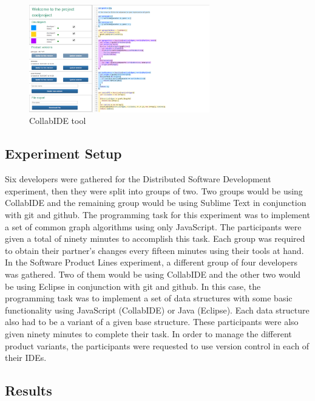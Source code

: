 \begin{figure}[htbp]
  \centering
  \includegraphics[width=0.7\textwidth]{img/fig1-collabIDEGeneral}
  \caption{CollabIDE tool}
  \label{fig:collabide}
\end{figure}

\subsection{Experiment Setup}

Six developers were gathered for the Distributed Software Development experiment, then they were split into groups of two. Two groups would be using CollabIDE and the remaining group would be using Sublime Text in conjunction with git and github. The programming task for this experiment was to implement a set of common graph algorithms using only JavaScript. The participants were given a total of ninety minutes to accomplish this task. Each group was required to obtain their partner’s changes every fifteen minutes using their tools at hand.
In the Software Product Lines experiment, a different group of four developers was gathered. Two of them would be using CollabIDE and the other two would be using Eclipse in conjunction with git and github. In this case, the programming task was to implement a set of data structures with some basic functionality using JavaScript (CollabIDE) or Java (Eclipse). Each data structure also had to be a variant of a given base structure. These participants were also given ninety minutes to complete their task. In order to manage the different product variants, the participants were requested to use version control in each of their IDEs.


	

\subsection{Results}

